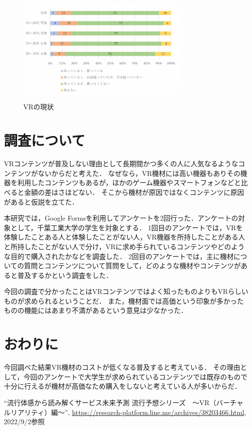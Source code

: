 \documentclass[twocolumn,10pt,a4j]{ltjsarticle}
\begin{document}
\begin{figure}[h]
\begin{center}
 \includegraphics[clip,width=85mm,height=55mm]{グラフ_0903.pdf}
\end{center}
 \caption{VRの現状}
 \label{fig:比較グラフ}
\end{figure}


\section{調査について}
VRコンテンツが普及しない理由として長期間かつ多くの人に人気なるようなコンテンツがないからだと考えた．
なぜなら，VR機材には高い機器もありその機器を利用したコンテンツもあるが，ほかのゲーム機器やスマートフォンなどと比べると金額の差はさほどない．
そこから機材が原因ではなくコンテンツに原因があると仮説を立てた．

本研究では，Google Formsを利用してアンケートを2回行った．アンケートの対象として，千葉工業大学の学生を対象とする．
1回目のアンケートでは，VRを体験したことある人と体験したことがない人，VR機器を所持したことがある人と所持したことがない人で分け，VRに求め手られているコンテンツやどのような目的で購入されたかなどを調査した．
2回目のアンケートでは，主に機材についての質問とコンテンツについて質問をして，どのような機材やコンテンツがあると普及するかという調査をした．

今回の調査で分かったことはVRコンテンツではよく知ったものよりもVRらしいものが求められるということだ．
また，機材面では高価という印象が多かったものの機能にはあまり不満があるという意見は少なかった．

\section{おわりに}
今回調べた結果VR機材のコストが低くなる普及すると考えている．
その理由として，今回のアンケートで大学生が求められているコンテンツでは既存のもので十分に行えるが機材が高価なため購入をしないと考えている人が多いからだ．

\begin{thebibliography}{99}
  ``流行体感から読み解くサービス未来予測 流行予想シリーズ　～VR（バーチャルリアリティ）編～'', \url{https://research-platform.line.me/archives/38203466.html}, 2022/9/2参照
\end{thebibliography}
\end{document}
